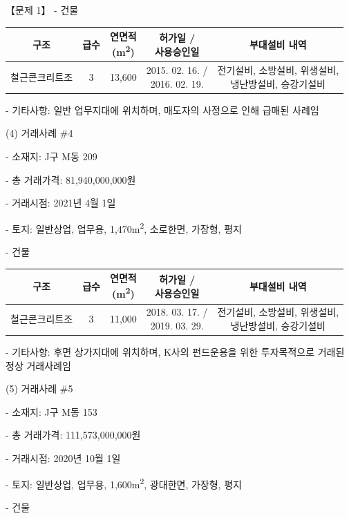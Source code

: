 \begin{longquestion}{【문제 1】}
- 건물 \par
{\small\centering
\begin{tabular}{|c|c|c|c|c|}\hline
구조 & 급수 & \makecell{연면적\\(m\textsuperscript{2})} & \makecell{허가일 /\\사용승인일} & 부대설비 내역 \\\hline
철근콘크리트조 & 3 & 13,600 & \makecell{2015. 02. 16. /\\2016. 02. 19.} & \makecell{전기설비, 소방설비, 위생설비,\\냉난방설비, 승강기설비} \\\hline
\end{tabular}\par}
- 기타사항: 일반 업무지대에 위치하며, 매도자의 사정으로 인해 급매된 사례임 \par
(4) 거래사례 \#4 \par
- 소재지: J구 M동 209 \par
- 총 거래가격: 81,940,000,000원 \par
- 거래시점: 2021년 4월 1일 \par
- 토지: 일반상업, 업무용, 1,470m\textsuperscript{2}, 소로한면, 가장형, 평지 \par
- 건물 \par
{\small\centering
\begin{tabular}{|c|c|c|c|c|}\hline
구조 & 급수 & \makecell{연면적\\(m\textsuperscript{2})} & \makecell{허가일 /\\사용승인일} & 부대설비 내역 \\\hline
철근콘크리트조 & 3 & 11,000 & \makecell{2018. 03. 17. /\\2019. 03. 29.} & \makecell{전기설비, 소방설비, 위생설비,\\냉난방설비, 승강기설비} \\\hline
\end{tabular}\par}
- 기타사항: 후면 상가지대에 위치하며, K사의 펀드운용을 위한 투자목적으로 거래된 정상 거래사례임 \par
(5) 거래사례 \#5 \par
- 소재지: J구 M동 153 \par
- 총 거래가격: 111,573,000,000원 \par
- 거래시점: 2020년 10월 1일 \par
- 토지: 일반상업, 업무용, 1,600m\textsuperscript{2}, 광대한면, 가장형, 평지 \par
- 건물 \par

\end{longquestion}
